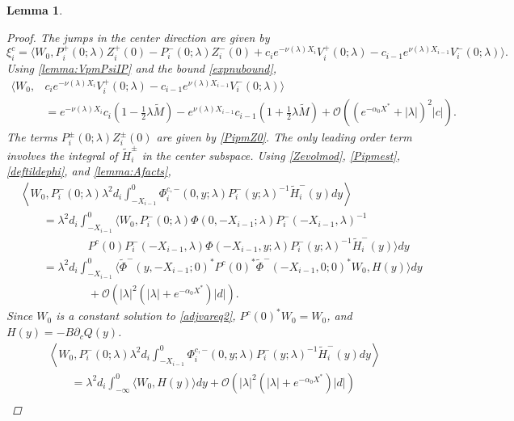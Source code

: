 \documentclass[12pt]{elsarticle}
\theoremstyle{plain}
\newtheorem{lemma}[theorem]{Lemma}
\theoremstyle{definition}
\theoremstyle{remark}
\numberwithin{theorem}{section}
\numberwithin{equation}{section}
\begin{document}
\begin{lemma}
\begin{proof}
The jumps in the center direction are given by
\[
\xi_i^c = 
\langle W_0, P_i^+(0; \lambda) Z_i^+(0) - P_i^-(0; \lambda) Z_i^-(0) + c_i e^{-\nu(\lambda)X_i}V_i^+(0; \lambda) - c_{i-1} e^{\nu(\lambda)X_{i-1}} V_i^-(0; \lambda) \rangle.
\]
Using \cref{lemma:VpmPsiIP} and the bound \cref{expnubound},
\begin{align*}
\langle W_0, &c_i e^{-\nu(\lambda)X_i}V_i^+(0; \lambda) - c_{i-1} e^{\nu(\lambda)X_{i-1}} V_i^-(0; \lambda) \rangle \\
&= e^{-\nu(\lambda)X_i}c_i\left( 1 - \frac{1}{2}\lambda \tilde{M} \right) 
- e^{\nu(\lambda)X_{i-1}}c_{i-1}\left( 1 + \frac{1}{2}\lambda \tilde{M} \right) + \mathcal{O}\left( (e^{-\alpha_0 X^*} +|\lambda|)^2 |c| \right).
\end{align*}
The terms $P_i^\pm(0; \lambda) Z_i^\pm(0)$ are given by \cref{PipmZ0}. The only leading order term involves the integral of $\tilde{H}_i^\pm$ in the center subspace. Using \cref{Zevolmod}, \cref{Pipmest}, \cref{deftildephi}, and \cref{lemma:Afacts},
\begin{equation*}
\begin{aligned}
&\left\langle W_0, P_i^-(0; \lambda) \lambda^2 d_i \int_{-X_{i-1}}^0 \Phi_i^{c,-}(0, y; \lambda) P_i^-(y; \lambda)^{-1} \tilde{H}_i^-(y) dy \right\rangle \\
&\qquad = \lambda^2 d_i \int_{-X_{i-1}}^0 \langle W_0, P_i^-(0; \lambda) \Phi(0, -X_{i-1}; \lambda) P_i^-(-X_{i-1}, \lambda)^{-1} \\
&\qquad\qquad\qquad
P^c(0) P_i^-(-X_{i-1}, \lambda) \Phi(-X_{i-1}, y; \lambda) P_i^-(y; \lambda)^{-1} \tilde{H}_i^-(y) \rangle dy \\
&\qquad=\lambda^2 d_i \int_{-X_{i-1}}^0 \langle \tilde{\Phi}^-(y, -X_{i-1}; 0)^* P^c(0)^* \tilde{\Phi}^-(-X_{i-1}, 0; 0)^* W_0,
 H(y) \rangle dy \\
& \qquad\qquad\qquad+ \mathcal{O}(|\lambda|^2 (|\lambda| + e^{- \alpha_0 X^*}) |d|).
\end{aligned}
\end{equation*}
Since $W_0$ is a constant solution to \cref{adjvareq2}, $P^c(0)^* W_0 = W_0$, and $H(y) = -B \partial_c Q(y)$. 
\begin{equation*}
\begin{aligned}
&\left\langle W_0, P_i^-(0; \lambda) \lambda^2 d_i \int_{-X_{i-1}}^0 \Phi_i^{c,-}(0, y; \lambda) P_i^-(y; \lambda)^{-1} \tilde{H}_i^-(y) dy \right\rangle \\
&\qquad=\lambda^2 d_i \int_{-\infty}^0 \langle W_0, H(y) \rangle dy + \mathcal{O}(|\lambda|^2 (|\lambda| + e^{- \alpha_0 X^*}) |d|) \\

\end{aligned}
\end{equation*}
\end{proof}
\end{lemma}
\end{document}
